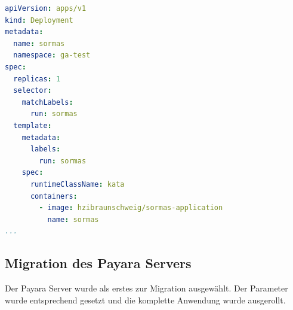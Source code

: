 \begin{lstlisting}[language=yaml, caption=runtimeClassName, label=lst:runtimeClassName]
apiVersion: apps/v1
kind: Deployment
metadata:
  name: sormas
  namespace: ga-test
spec: 
  replicas: 1
  selector: 
    matchLabels:
      run: sormas
  template:
    metadata:
      labels:
        run: sormas
    spec:
      runtimeClassName: kata
      containers:
        - image: hzibraunschweig/sormas-application
          name: sormas
...
\end{lstlisting}


\subsection{Migration des Payara Servers}
Der Payara Server wurde als erstes zur Migration ausgewählt. 
Der Parameter wurde entsprechend gesetzt und die komplette Anwendung wurde ausgerollt. 

